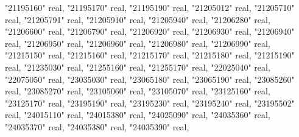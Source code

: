 \documentclass[12pt,oneside]{reedthesis}
\newenvironment{Shaded}{\begin{snugshade}}{\end{snugshade}}
\newcommand{\DataTypeTok}[1]{\textcolor[rgb]{0.13,0.29,0.53}{#1}}
\newcommand{\NormalTok}[1]{#1}
\newcommand{\OtherTok}[1]{\textcolor[rgb]{0.56,0.35,0.01}{#1}}
\begin{document}
\begin{Shaded}
\begin{Highlighting}[]
     \OtherTok{"21195160"} \DataTypeTok{real}\NormalTok{, }\OtherTok{"21195170"} \DataTypeTok{real}\NormalTok{, }\OtherTok{"21195190"} \DataTypeTok{real}\NormalTok{, }\OtherTok{"21205012"} \DataTypeTok{real}\NormalTok{, }\OtherTok{"21205710"} \DataTypeTok{real}\NormalTok{, }\OtherTok{"21205791"} \DataTypeTok{real}\NormalTok{, }
     \OtherTok{"21205910"} \DataTypeTok{real}\NormalTok{, }\OtherTok{"21205940"} \DataTypeTok{real}\NormalTok{, }\OtherTok{"21206280"} \DataTypeTok{real}\NormalTok{, }\OtherTok{"21206600"} \DataTypeTok{real}\NormalTok{, }\OtherTok{"21206790"} \DataTypeTok{real}\NormalTok{, }\OtherTok{"21206920"} \DataTypeTok{real}\NormalTok{, }
     \OtherTok{"21206930"} \DataTypeTok{real}\NormalTok{, }\OtherTok{"21206940"} \DataTypeTok{real}\NormalTok{, }\OtherTok{"21206950"} \DataTypeTok{real}\NormalTok{, }\OtherTok{"21206960"} \DataTypeTok{real}\NormalTok{, }\OtherTok{"21206980"} \DataTypeTok{real}\NormalTok{, }\OtherTok{"21206990"} \DataTypeTok{real}\NormalTok{, }
     \OtherTok{"21215150"} \DataTypeTok{real}\NormalTok{, }\OtherTok{"21215160"} \DataTypeTok{real}\NormalTok{, }\OtherTok{"21215170"} \DataTypeTok{real}\NormalTok{, }\OtherTok{"21215180"} \DataTypeTok{real}\NormalTok{, }\OtherTok{"21215190"} \DataTypeTok{real}\NormalTok{, }\OtherTok{"21235030"} \DataTypeTok{real}\NormalTok{, }
     \OtherTok{"21255160"} \DataTypeTok{real}\NormalTok{, }\OtherTok{"21255170"} \DataTypeTok{real}\NormalTok{, }\OtherTok{"22025040"} \DataTypeTok{real}\NormalTok{, }\OtherTok{"22075050"} \DataTypeTok{real}\NormalTok{, }\OtherTok{"23035030"} \DataTypeTok{real}\NormalTok{, }\OtherTok{"23065180"} \DataTypeTok{real}\NormalTok{, }
     \OtherTok{"23065190"} \DataTypeTok{real}\NormalTok{, }\OtherTok{"23085260"} \DataTypeTok{real}\NormalTok{, }\OtherTok{"23085270"} \DataTypeTok{real}\NormalTok{, }\OtherTok{"23105060"} \DataTypeTok{real}\NormalTok{, }\OtherTok{"23105070"} \DataTypeTok{real}\NormalTok{, }\OtherTok{"23125160"} \DataTypeTok{real}\NormalTok{, }
     \OtherTok{"23125170"} \DataTypeTok{real}\NormalTok{, }\OtherTok{"23195190"} \DataTypeTok{real}\NormalTok{, }\OtherTok{"23195230"} \DataTypeTok{real}\NormalTok{, }\OtherTok{"23195240"} \DataTypeTok{real}\NormalTok{, }\OtherTok{"23195502"} \DataTypeTok{real}\NormalTok{, }\OtherTok{"24015110"} \DataTypeTok{real}\NormalTok{, }
     \OtherTok{"24015380"} \DataTypeTok{real}\NormalTok{, }\OtherTok{"24025090"} \DataTypeTok{real}\NormalTok{, }\OtherTok{"24035360"} \DataTypeTok{real}\NormalTok{, }\OtherTok{"24035370"} \DataTypeTok{real}\NormalTok{, }\OtherTok{"24035380"} \DataTypeTok{real}\NormalTok{, }\OtherTok{"24035390"} \DataTypeTok{real}\NormalTok{, }

\end{Highlighting}
\end{Shaded}
\end{document}
